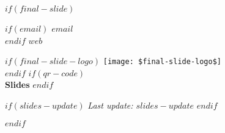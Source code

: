 $if(final-slide)$
\begin{frame}
\begin{centering}
\vfill
$if(email)$
\faEnvelope \; \textbf{$email$} \\
$endif$
\vspace{10pt}
\faGlobe \; \textbf{$web$} \\

\vspace{15pt}

$if(final-slide-logo)$
    \texttt{[image: \$final-slide-logo\$]} \\
    \vspace{10pt}
$endif$
$if(qr-code)$
    \centering
    \textcolor{blue}{} \\[0.5em]
    \textbf{Slides}
$endif$

$if(slides-update)$
\scriptsize \textit{Last update: $slides-update$} \normalsize
$endif$

\vfill
\end{centering}
\end{frame}
$endif$